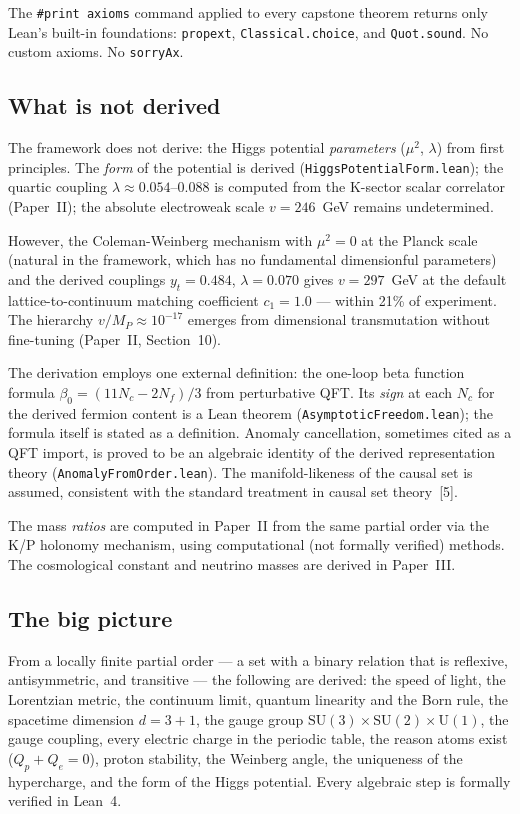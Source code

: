 \documentclass[11pt,letterpaper]{article}
\begin{document}
\noindent The \texttt{\#print axioms} command applied to every capstone
theorem returns only Lean's built-in foundations: \texttt{propext},
\texttt{Classical.choice}, and \texttt{Quot.sound}.  No custom axioms.
No \texttt{sorryAx}.

\subsection{What is not derived}

The framework does not derive: the Higgs potential \emph{parameters}
($\mu^2$, $\lambda$) from first principles.  The \emph{form} of the
potential is derived (\texttt{HiggsPotentialForm.lean}); the quartic
coupling $\lambda \approx 0.054$--$0.088$ is computed from the
K-sector scalar correlator (Paper~II); the absolute electroweak
scale $v = 246$~GeV remains undetermined.

However, the Coleman-Weinberg mechanism with $\mu^2 = 0$ at the
Planck scale (natural in the framework, which has no fundamental
dimensionful parameters) and the derived couplings
$y_t = 0.484$, $\lambda = 0.070$ gives $v = 297$~GeV at the
default lattice-to-continuum matching coefficient $c_1 = 1.0$
--- within 21\% of experiment.  The hierarchy $v/M_P \approx
10^{-17}$ emerges from dimensional transmutation without
fine-tuning (Paper~II, Section~10).

The derivation employs one external definition: the one-loop beta
function formula $\beta_0 = (11N_c - 2N_f)/3$ from perturbative QFT.
Its \emph{sign} at each $N_c$ for the derived fermion content is a
Lean theorem (\texttt{AsymptoticFreedom.lean}); the formula itself
is stated as a definition.  Anomaly cancellation, sometimes cited as
a QFT import, is proved to be an algebraic identity of the derived
representation theory (\texttt{AnomalyFromOrder.lean}).  The
manifold-likeness of the causal set is assumed, consistent with the
standard treatment in causal set theory~[5].

The mass \emph{ratios} are computed in Paper~II from the same partial
order via the K/P holonomy mechanism, using computational (not
formally verified) methods.  The cosmological constant and neutrino
masses are derived in Paper~III.

\subsection{The big picture}

From a locally finite partial order --- a set with a binary relation
that is reflexive, antisymmetric, and transitive --- the following
are derived:
the speed of light, the Lorentzian metric, the continuum limit,
quantum linearity and the Born rule, the spacetime dimension
$d = 3{+}1$, the gauge group $\mathrm{SU}(3) \times
\mathrm{SU}(2) \times \mathrm{U}(1)$, the gauge coupling, every
electric charge in the periodic table, the reason atoms exist
($Q_p + Q_e = 0$), proton stability, the Weinberg angle, the
uniqueness of the hypercharge, and the form of the Higgs potential.
Every algebraic step is formally verified in Lean~4.
\end{document}
